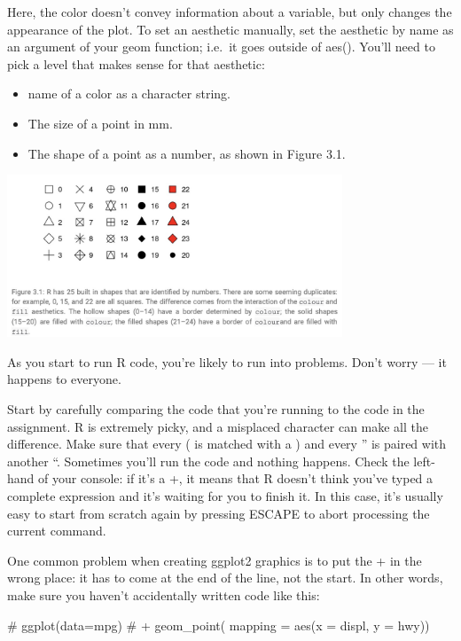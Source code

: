 \documentclass[
  letterpaper,
  DIV=11,
  numbers=noendperiod]{scrreprt}
\newenvironment{Shaded}{\begin{snugshade}}{\end{snugshade}}
\newcommand{\CommentTok}[1]{\textcolor[rgb]{0.37,0.37,0.37}{#1}}
\providecommand{\tightlist}{%
  \setlength{\itemsep}{0pt}\setlength{\parskip}{0pt}}\usepackage{longtable,booktabs,array}
\begin{document}
Here, the color doesn't convey information about a variable, but only
changes the appearance of the plot. To set an aesthetic manually, set
the aesthetic by name as an argument of your geom function; i.e.~it goes
outside of aes(). You'll need to pick a level that makes sense for that
aesthetic:

\begin{itemize}
\tightlist
\item
  name of a color as a character string.
\item
  The size of a point in mm.
\item
  The shape of a point as a number, as shown in Figure 3.1.
\end{itemize}

\includegraphics[width=0.75\textwidth,height=\textheight]{./images/Daily-2-Pic-5.jpg}

As you start to run R code, you're likely to run into problems. Don't
worry --- it happens to everyone.

Start by carefully comparing the code that you're running to the code in
the assignment. R is extremely picky, and a misplaced character can make
all the difference. Make sure that every ( is matched with a ) and every
'' is paired with another ``. Sometimes you'll run the code and nothing
happens. Check the left-hand of your console: if it's a +, it means that
R doesn't think you've typed a complete expression and it's waiting for
you to finish it. In this case, it's usually easy to start from scratch
again by pressing ESCAPE to abort processing the current command.

One common problem when creating ggplot2 graphics is to put the + in the
wrong place: it has to come at the end of the line, not the start. In
other words, make sure you haven't accidentally written code like this:

\begin{Shaded}
\begin{Highlighting}[]
\CommentTok{\# ggplot(data=mpg)}
\CommentTok{\# + geom\_point( mapping = aes(x = displ, y = hwy))}
\end{Highlighting}
\end{Shaded}
\end{document}

